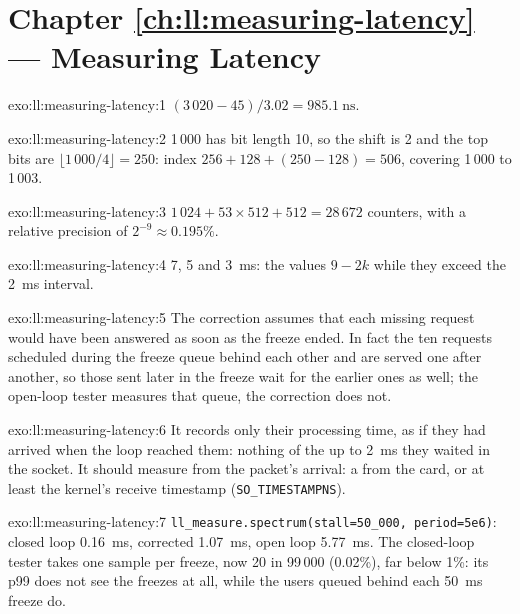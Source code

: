 \section*{Chapter \ref{ch:ll:measuring-latency} --- Measuring Latency}

\begin{solution}{exo:ll:measuring-latency:1}
$(3\,020 - 45)/3.02 = \qty{985.1}{\nano\second}$.
\end{solution}

\begin{solution}{exo:ll:measuring-latency:2}
1\,000 has bit length 10, so the shift is 2 and the top bits are $\lfloor 1\,000/4 \rfloor = 250$: index $256 + 128 +
(250-128) = 506$, covering 1\,000 to 1\,003.
\end{solution}

\begin{solution}{exo:ll:measuring-latency:3}
$1\,024 + 53 \times 512 + 512 = 28\,672$ counters, with a relative precision of $2^{-9} \approx 0.195\%$.
\end{solution}

\begin{solution}{exo:ll:measuring-latency:4}
7, 5 and \qty{3}{\milli\second}: the values $9 - 2k$ while they exceed the \qty{2}{\milli\second} interval.
\end{solution}

\begin{solution}{exo:ll:measuring-latency:5}
The correction assumes that each missing request would have been answered as soon as the freeze ended. In fact the ten
requests scheduled during the freeze queue behind each other and are served one after another, so those sent later in
the freeze wait for the earlier ones as well; the open-loop tester measures that queue, the correction does not.
\end{solution}

\begin{solution}{exo:ll:measuring-latency:6}
It records only their processing time, as if they had arrived when the loop reached them: nothing of the up to
\qty{2}{\milli\second} they waited in the socket. It should measure from the packet's arrival: a  from
the card, or at least the kernel's receive timestamp (\texttt{SO\_TIMESTAMPNS}).
\end{solution}

\begin{solution}{exo:ll:measuring-latency:7}
\texttt{ll\_measure.spectrum(stall=50\_000, period=5e6)}: closed loop \qty{0.16}{\milli\second}, corrected
\qty{1.07}{\milli\second}, open loop \qty{5.77}{\milli\second}. The closed-loop tester takes one sample per freeze, now
20 in 99\,000 (0.02\%), far below 1\%: its p99 does not see the freezes at all, while the users queued behind each
\qty{50}{\milli\second} freeze do.
\end{solution}

